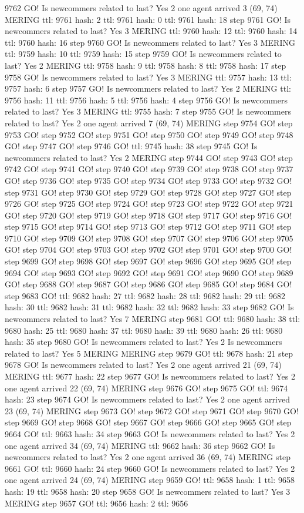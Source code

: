 9762 GO! Is newcommers related to last? Yes 2 one agent arrived 3 (69, 74) MERING ttl: 9761 hash: 2 ttl: 9761 hash: 0 ttl: 9761 hash: 18 step 9761 GO! Is newcommers related to last? Yes 3 MERING ttl: 9760 hash: 12 ttl: 9760 hash: 14 ttl: 9760 hash: 16 step 9760 GO! Is newcommers related to last? Yes 3 MERING ttl: 9759 hash: 10 ttl: 9759 hash: 15 step 9759 GO! Is newcommers related to last? Yes 2 MERING ttl: 9758 hash: 9 ttl: 9758 hash: 8 ttl: 9758 hash: 17 step 9758 GO! Is newcommers related to last? Yes 3 MERING ttl: 9757 hash: 13 ttl: 9757 hash: 6 step 9757 GO! Is newcommers related to last? Yes 2 MERING ttl: 9756 hash: 11 ttl: 9756 hash: 5 ttl: 9756 hash: 4 step 9756 GO! Is newcommers related to last? Yes 3 MERING ttl: 9755 hash: 7 step 9755 GO! Is newcommers related to last? Yes 2 one agent arrived 7 (69, 74) MERING step 9754 GO! step 9753 GO! step 9752 GO! step 9751 GO! step 9750 GO! step 9749 GO! step 9748 GO! step 9747 GO! step 9746 GO! ttl: 9745 hash: 38 step 9745 GO! Is newcommers related to last? Yes 2 MERING step 9744 GO! step 9743 GO! step 9742 GO! step 9741 GO! step 9740 GO! step 9739 GO! step 9738 GO! step 9737 GO! step 9736 GO! step 9735 GO! step 9734 GO! step 9733 GO! step 9732 GO! step 9731 GO! step 9730 GO! step 9729 GO! step 9728 GO! step 9727 GO! step 9726 GO! step 9725 GO! step 9724 GO! step 9723 GO! step 9722 GO! step 9721 GO! step 9720 GO! step 9719 GO! step 9718 GO! step 9717 GO! step 9716 GO! step 9715 GO! step 9714 GO! step 9713 GO! step 9712 GO! step 9711 GO! step 9710 GO! step 9709 GO! step 9708 GO! step 9707 GO! step 9706 GO! step 9705 GO! step 9704 GO! step 9703 GO! step 9702 GO! step 9701 GO! step 9700 GO! step 9699 GO! step 9698 GO! step 9697 GO! step 9696 GO! step 9695 GO! step 9694 GO! step 9693 GO! step 9692 GO! step 9691 GO! step 9690 GO! step 9689 GO! step 9688 GO! step 9687 GO! step 9686 GO! step 9685 GO! step 9684 GO! step 9683 GO! ttl: 9682 hash: 27 ttl: 9682 hash: 28 ttl: 9682 hash: 29 ttl: 9682 hash: 30 ttl: 9682 hash: 31 ttl: 9682 hash: 32 ttl: 9682 hash: 33 step 9682 GO! Is newcommers related to last? Yes 7 MERING step 9681 GO! ttl: 9680 hash: 38 ttl: 9680 hash: 25 ttl: 9680 hash: 37 ttl: 9680 hash: 39 ttl: 9680 hash: 26 ttl: 9680 hash: 35 step 9680 GO! Is newcommers related to last? Yes 2 Is newcommers related to last? Yes 5 MERING MERING step 9679 GO! ttl: 9678 hash: 21 step 9678 GO! Is newcommers related to last? Yes 2 one agent arrived 21 (69, 74) MERING ttl: 9677 hash: 22 step 9677 GO! Is newcommers related to last? Yes 2 one agent arrived 22 (69, 74) MERING step 9676 GO! step 9675 GO! ttl: 9674 hash: 23 step 9674 GO! Is newcommers related to last? Yes 2 one agent arrived 23 (69, 74) MERING step 9673 GO! step 9672 GO! step 9671 GO! step 9670 GO! step 9669 GO! step 9668 GO! step 9667 GO! step 9666 GO! step 9665 GO! step 9664 GO! ttl: 9663 hash: 34 step 9663 GO! Is newcommers related to last? Yes 2 one agent arrived 34 (69, 74) MERING ttl: 9662 hash: 36 step 9662 GO! Is newcommers related to last? Yes 2 one agent arrived 36 (69, 74) MERING step 9661 GO! ttl: 9660 hash: 24 step 9660 GO! Is newcommers related to last? Yes 2 one agent arrived 24 (69, 74) MERING step 9659 GO! ttl: 9658 hash: 1 ttl: 9658 hash: 19 ttl: 9658 hash: 20 step 9658 GO! Is newcommers related to last? Yes 3 MERING step 9657 GO! ttl: 9656 hash: 2 ttl: 9656 